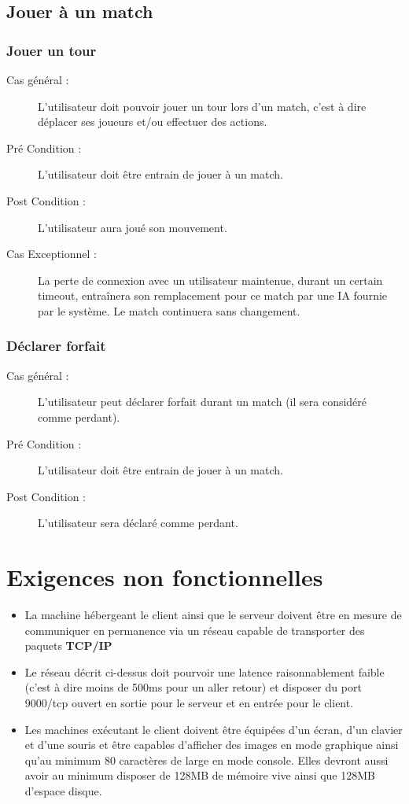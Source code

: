 \documentclass[a4paper]{report}
\begin{document}
\subsection{Jouer à un match}
\subsubsection{Jouer un tour}
\begin{description}
    \item[Cas général :] L'\gls{utilisateur} doit pouvoir jouer un tour lors d'un match, c'est à dire déplacer ses \glspl{joueur} et/ou effectuer des actions.
    \item[Pré Condition  :] L'\gls{utilisateur} doit être entrain de jouer à un match.
    \item[Post Condition :] L'\gls{utilisateur} aura joué son mouvement.
    \item[Cas Exceptionnel :] La perte de connexion avec un \gls{utilisateur} maintenue, durant un certain timeout, entraînera son remplacement pour ce match par une IA fournie par le système. Le match continuera sans changement.
\end{description}
\subsubsection{Déclarer forfait}
\begin{description}
    \item[Cas général :] L'\gls{utilisateur} peut déclarer forfait durant un match (il sera considéré comme perdant).
    \item[Pré Condition  :] L'\gls{utilisateur} doit être entrain de jouer à un match.
    \item[Post Condition :] L'\gls{utilisateur} sera déclaré comme perdant.
\end{description}


\section{Exigences non fonctionnelles}
\begin{itemize}
    \item La machine hébergeant le \gls{client} ainsi que le \gls{serveur} doivent être en mesure de communiquer en permanence via un réseau capable de transporter des paquets \textbf{TCP/IP}
    \item Le réseau décrit ci-dessus doit pourvoir une latence raisonnablement faible (c'est à dire moins de 500ms pour un aller retour) et disposer du port 9000/tcp ouvert en sortie pour le serveur et en entrée pour le client.
    \item Les machines exécutant le \gls{client} doivent être équipées d'un écran, d'un clavier et d'une souris et être capables d'afficher des images en mode graphique ainsi qu'au minimum 80 caractères de large en mode console. Elles devront aussi avoir au minimum disposer de 128MB de mémoire vive ainsi que 128MB d'espace disque.
\end{itemize}
\end{document}
